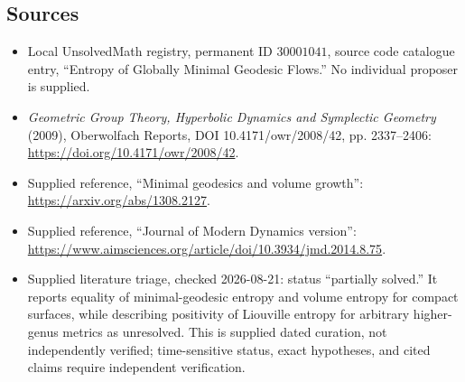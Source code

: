 \documentclass[11pt]{article}
\begin{document}
\subsection{Sources}
\begin{itemize}
\item Local UnsolvedMath registry, permanent ID \(30001041\), source code catalogue entry, ``Entropy of Globally Minimal Geodesic Flows.'' No individual proposer is supplied.
\item \emph{Geometric Group Theory, Hyperbolic Dynamics and Symplectic Geometry} (2009), Oberwolfach Reports, DOI 10.4171/owr/2008/42, pp. 2337--2406: \url{https://doi.org/10.4171/owr/2008/42}.
\item Supplied reference, ``Minimal geodesics and volume growth'': \url{https://arxiv.org/abs/1308.2127}.
\item Supplied reference, ``Journal of Modern Dynamics version'': \url{https://www.aimsciences.org/article/doi/10.3934/jmd.2014.8.75}.
\item Supplied literature triage, checked 2026-08-21: status ``partially solved.'' It reports equality of minimal-geodesic entropy and volume entropy for compact surfaces, while describing positivity of Liouville entropy for arbitrary higher-genus metrics as unresolved. This is supplied dated curation, not independently verified; time-sensitive status, exact hypotheses, and cited claims require independent verification.
\end{itemize}
\end{document}
